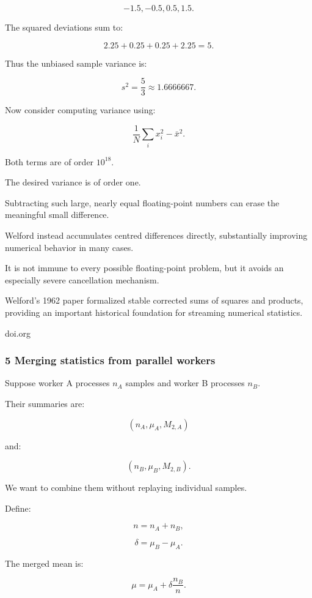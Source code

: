 \[
 -1.5,-0.5,0.5,1.5.
\]

The squared deviations sum to:

\[
 2.25+0.25+0.25+2.25=5.
\]

Thus the unbiased sample variance is:

\[
 \boxed{s^2=\frac53\approx1.6666667}.
\]

Now consider computing variance using:

\[
 \frac1N\sum_ix_i^2-\bar x^2.
\]

Both terms are of order \(10^{18}\).

The desired variance is of order one.

Subtracting such large, nearly equal floating-point numbers can erase the meaningful small difference.

Welford instead accumulates centred differences directly, substantially improving numerical behavior in many cases.

It is not immune to every possible floating-point problem, but it avoids an especially severe cancellation mechanism.

Welford's 1962 paper formalized stable corrected sums of squares and products, providing an important historical foundation for streaming numerical statistics.

doi.org

\subsubsection{5 Merging statistics from parallel workers}\label{02-foundations-ii-ch030-merging-statistics-from-parallel-workers}

\hypertarget{02-foundations-ii-ch030-merging-statistics-from-parallel-workers}{}

Suppose worker A processes \(n_A\) samples and worker B processes \(n_B\).

Their summaries are:

\[
 (n_A,\mu_A,M_{2,A})
\]

and:

\[
 (n_B,\mu_B,M_{2,B}).
\]

We want to combine them without replaying individual samples.

Define:

\[
 n=n_A+n_B,
\]

\[
 \delta=\mu_B-\mu_A.
\]

The merged mean is:

\[
 \boxed{ \mu= \mu_A+\delta\frac{n_B}{n} }.
\]

